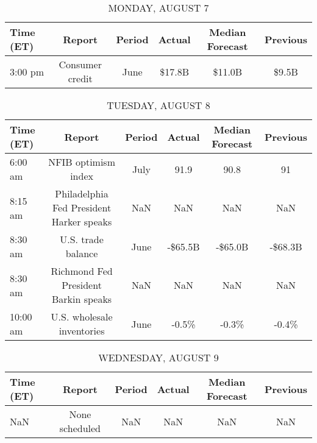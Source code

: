 \documentclass{article}%
\begin{document}
%
\normalsize%


\begin{table}[htbp]%
\caption{MONDAY, AUGUST 7}%
\centering%
\begin{adjustbox}{width=1\textwidth}%
\begin{tabular}{lccccc}
\toprule
Time (ET) &          Report & Period & Actual & Median Forecast & Previous \\
\midrule
  3:00 pm & Consumer credit &   June & \$17.8B &          \$11.0B &    \$9.5B \\
\bottomrule
\end{tabular}
%
\end{adjustbox}%
\end{table}

%


\begin{table}[htbp]%
\caption{TUESDAY, AUGUST 8}%
\centering%
\begin{adjustbox}{width=1\textwidth}%
\begin{tabular}{lccccc}
\toprule
Time (ET) &                                   Report & Period &  Actual & Median Forecast & Previous \\
\midrule
  6:00 am &                      NFIB optimism index &   July &    91.9 &            90.8 &       91 \\
  8:15 am & Philadelphia Fed President Harker speaks &    NaN &     NaN &             NaN &      NaN \\
  8:30 am &                       U.S. trade balance &   June & -\$65.5B &         -\$65.0B &  -\$68.3B \\
  8:30 am &     Richmond Fed President Barkin speaks &    NaN &     NaN &             NaN &      NaN \\
 10:00 am &               U.S. wholesale inventories &   June &   -0.5\% &           -0.3\% &    -0.4\% \\
\bottomrule
\end{tabular}
%
\end{adjustbox}%
\end{table}

%


\begin{table}[htbp]%
\caption{WEDNESDAY, AUGUST 9}%
\centering%
\begin{adjustbox}{width=1\textwidth}%
\begin{tabular}{lccccc}
\toprule
Time (ET) &         Report & Period & Actual & Median Forecast & Previous \\
\midrule
      NaN & None scheduled &    NaN &    NaN &             NaN &      NaN \\
\bottomrule
\end{tabular}
%
\end{adjustbox}%
\end{table}
\end{document}
